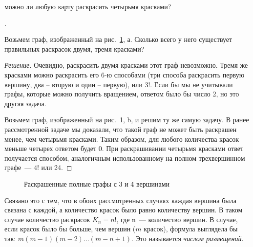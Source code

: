 \documentclass[russian]{lecture-notes}
\begin{document}
    \begin{conjecture} можно ли любую карту раскрасить четырьмя красками?
    \end{conjecture}
    \begin{example*}.

    Возьмем граф, изображенный на рис.~\ref{fig:counting}, а. Сколько всего у него существует правильных раскрасок двумя, тремя красками?

    \begin{proof}[Решение]
        Очевидно, раскрасить двумя красками этот граф невозможно. Тремя же красками можно раскрасить его 6-ю способами (три способа раскрасить первую вершину, два -- вторую и один -- первую), или $3!$. Если бы мы не учитывали графы, которые можно получить вращением, ответом было бы число 2, но это другая задача.

        Возьмем граф, изображенный на рис.~\ref{fig:counting}, b, и решим ту же самую задачу. В ранее рассмотренной задаче мы доказали, что такой граф не может быть раскрашен менее, чем четырьмя красками. Таким образом, для любого количества красок меньше четырех ответом будет 0. При раскрашивании четырьмя красками ответ получается способом, аналогичным использованному на полном трехвершинном графе~--- $4!$ или 24.
    \end{proof}

    \begin{figure}
        \centering
        \caption{Раскрашенные полные графы с 3 и 4 вершинами}
        \label{fig:counting}
    \end{figure}
    Связано это с тем, что в обоих рассмотренных случаях каждая вершина была связана с каждой, а количество красок было равно количеству вершин. В таком случае количество раскрасок $K_n = n!$, где n~--- количество вершин. В случае, если красок было бы больше, чем вершин ($m$ красок), формула выглядела бы так: $m(m-1)(m-2)\ldots(m-n+1)$. Это называется {\em числом размещений}.
    \vspace {0.25 cm}


\end{example*}
\end{document}
